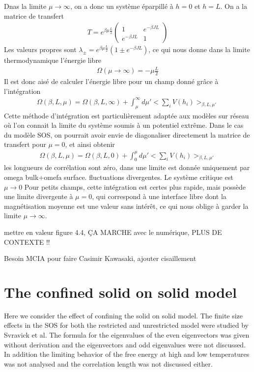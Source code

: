 Dnas la limite $\mu \rightarrow \infty$, on a donc un système éparpillé à $h=0$ et $h=L$. On a la matrice de transfert
\begin{align}
T= e^{\beta \mu \frac{L}{2}}
  \begin{pmatrix}
    1 & e^{-\beta  J L} \\
    e^{-\beta  J L} & 1
  \end{pmatrix}
\end{align}
Les valeurs propres sont $\lambda_\pm = e^{ \beta \mu \frac{L}{2}}( 1 \pm e^{-\beta J L})$, ce qui nous donne dans la limite thermodynamique l'énergie libre 
\begin{align}
  \Omega(\mu \rightarrow \infty) = - \mu \frac{L}{2}
\end{align}
Il est donc aisé de calculer l'énergie libre pour un champ donné grâce à l'intégration
\begin{align}
        \Omega(\beta,L,\mu) = \Omega(\beta,L,\infty) + \int_{\mu}^\infty d\mu'  < \sum_i V(h_i) >_{\beta,L,\mu'} 
\end{align}
Cette méthode d'intégration est particulièrement adaptée aux modèles sur réseau où l'on connait la limite du système soumis à un potentiel extrême. Dans le cas du modèle SOS, on pourrait avoir envie de diagonaliser directement la matrice de transfert pour $\mu=0$, et ainsi obtenir
\begin{align}
        \Omega(\beta,L,\mu) =\Omega(\beta,L,0) + \int_{0}^\mu d\mu'  < \sum_i V(h_i) >_{\beta,L,\mu'} 
\end{align}
{\color{red} les longueurs de corrélation sont zéro, dans une limite est donnée uniquement par omega bulk+omefa surface.  fluctuations divergentes. Le système critique est $\mu \to 0$}
Pour petits champs, cette intégration est certes plus rapide, mais possède une limite divergente à $\mu=0$, qui correspond à une interface libre dont la magnétisation moyenne est une valeur sans intérêt, ce qui nous oblige à garder la limite $\mu \to \infty$.

 {\color{red} mettre en valeur figure 4.4, ÇA MARCHE avec le numérique, PLUS DE CONTEXTE !!}

{\color{red} Besoin MCIA pour faire Casimir Kawasaki, ajouter cisaillement }

\section{The confined solid on solid model}
Here we consider the effect of confining the solid on solid model. The finite size effects in the SOS for both the restricted and unrestricted model were studied by Svravick et al. The formula for the eigenvalues of the even eigenvectors was given without derivation and the eigenvectors and odd eigenvalues were not discussed. In addition the limiting behavior of the free energy at high and low temperatures was not analysed and the correlation length was not discussed either. 

